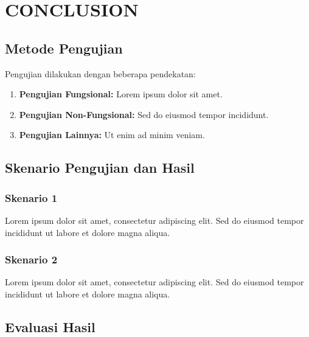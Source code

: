 \chapter{CONCLUSION}

\section{Metode Pengujian}


Pengujian dilakukan dengan beberapa pendekatan:

\begin{enumerate}
    \item \textbf{Pengujian Fungsional:} Lorem ipsum dolor sit amet.
    \item \textbf{Pengujian Non-Fungsional:} Sed do eiusmod tempor incididunt.
    \item \textbf{Pengujian Lainnya:} Ut enim ad minim veniam.
\end{enumerate}

\section{Skenario Pengujian dan Hasil}

\subsection{Skenario 1}


Lorem ipsum dolor sit amet, consectetur adipiscing elit. Sed do eiusmod tempor incididunt ut labore et dolore magna aliqua.

\subsection{Skenario 2}


Lorem ipsum dolor sit amet, consectetur adipiscing elit. Sed do eiusmod tempor incididunt ut labore et dolore magna aliqua.

\section{Evaluasi Hasil}


